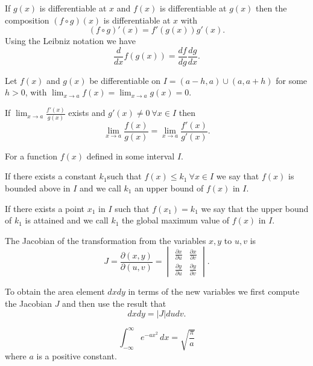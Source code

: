 \documentclass[10pt, a4paper]{article}
\begin{document}
\begin{theorem}
    If $g(x)$ is differentiable at $x$ and $f(x)$ is differentiable at $g(x)$ then the composition $(f \circ g)(x)$ is differentiable at $x$ with
    \[
    (f \circ g)'(x) = f'(g(x))g'(x).
    \]
    Using the Leibniz notation we have
    \[
    \frac{d}{dx}f(g(x)) = \frac{df}{dg}\frac{dg}{dx}.
    \]
\end{theorem}

\begin{theorem}
    Let $f(x)$ and $g(x)$ be differentiable on $I = (a - h, a) \cup (a, a + h)$ for some $h > 0$,
    with $\lim_{x \rightarrow a}f(x) = \lim_{x \rightarrow a}g(x) = 0$.

    If $\lim_{x \rightarrow a}\frac{f'(x)}{g(x)}$ exists and $g'(x) \neq 0\ \forall x \in I$ then
    \[
    \lim_{x \rightarrow a}\frac{f(x)}{g(x)} = \lim_{x \rightarrow a}\frac{f'(x)}{g'(x)}.
    \]
\end{theorem}

For a function $f(x)$ defined in some interval $I$.
\begin{definition}
    If there exists a constant $k_1$such that $f(x) \leq k_1\ \forall x \in I$ we say that $f(x)$ is bounded above in $I$ and we call $k_1$ an upper bound of $f(x)$ in $I$.

    If there exists a point $x_1$ in $I$ such that $f(x_1) = k_1$ we say that the upper bound of $k_1$ is attained and we call $k_1$ the global maximum value of $f(x)$ in $I$.
    
\end{definition}

\begin{definition}
    The Jacobian of the transformation from the variables $x, y$ to $u, v$ is
    \[
    J = \frac{\partial(x, y)}{\partial(u, v)} = \begin{vmatrix}
        \frac{\partial x}{\partial u} & \frac{\partial x}{\partial v} \\
        \frac{\partial y}{\partial u} & \frac{\partial y}{\partial v}
    \end{vmatrix}.
    \]
\end{definition}

To obtain the area element $dxdy$ in terms of the new variables we first compute the Jacobian $J$ and then use the result that
\[
dxdy = |J|dudv.
\]

\begin{definition}
    \[
    \int_{-\infty}^{\infty}e ^ {-ax ^ 2}\,dx = \sqrt{\frac{\pi}{a}}
    \]
    where $a$ is a positive constant.
\end{definition}
\end{document}
